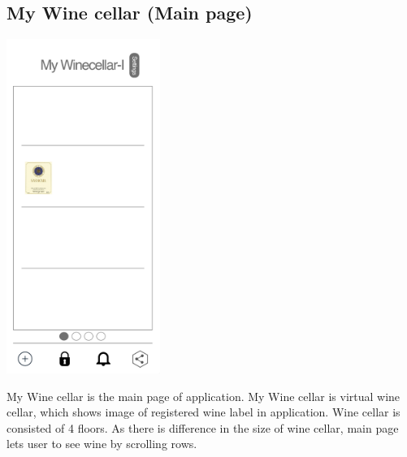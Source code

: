 \documentclass[conference]{IEEEtran}
\numberwithin{figure}{subsection}
\begin{document}
\subsection{My Wine cellar (Main page)}
\centerline{\includegraphics[width=5cm]{mywinece.png}}
My Wine cellar is the main page of application. My Wine cellar is virtual wine cellar, which shows image of registered wine label in application. Wine cellar is consisted of 4 floors. As there is difference in the size of wine cellar, main page lets user to see wine by scrolling rows.
\end{document}
